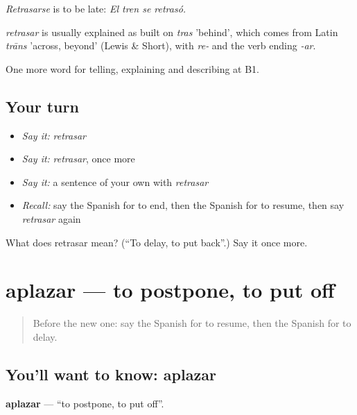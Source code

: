 \emph{Retrasarse} is to be late: \emph{El tren se retrasó.}

\begin{cousinweb}
\emph{retrasar} is usually explained as built on \emph{tras} 'behind', which comes from Latin \emph{trāns} 'across, beyond' (Lewis \& Short), with \emph{re-} and the verb ending \emph{-ar}.
\end{cousinweb}

\begin{grammarlens}[title={What you've built}]
One more word for telling, explaining and describing at B1.
\end{grammarlens}

\subsection*{Your turn}
\begin{itemize}
\raggedright
  \item \emph{Say it:} \emph{retrasar}
  \item \emph{Say it:} \emph{retrasar}, once more
  \item \emph{Say it:} a sentence of your own with \emph{retrasar}
  \item \emph{Recall:} say the Spanish for to end, then the Spanish for to resume, then say \emph{retrasar} again
\end{itemize}

\begin{tcolorbox}[breakable,colback=teal!4,colframe=teal!35!black,title={Before you move on}]
What does retrasar mean? (\textquotedblleft{}To delay, to put back\textquotedblright{}.) Say it once more.
\end{tcolorbox}
\section[aplazar]{aplazar — to postpone, to put off}

\label{lesson:ES-C543-aplazar}



\begin{quote}
Before the new one: say the Spanish for to resume, then the Spanish for to delay.
\end{quote}

\subsection*{You'll want to know: aplazar}
\textbf{aplazar} — \textquotedblleft{}to postpone, to put off\textquotedblright{}.

